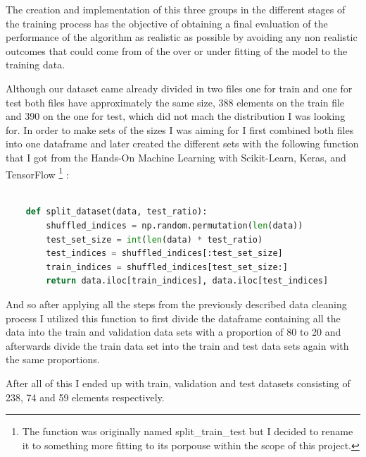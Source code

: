 \documentclass[12pt, a4paper]{article}
\begin{document}
	The creation and implementation of this three groups in the different stages of the training process has the objective of obtaining a final evaluation of the performance of the algorithm as realistic as possible by avoiding any non realistic outcomes that could come from of the over or under fitting of the model to the training data.
	
	Although our dataset came already divided in two files one for train and one for test both files have approximately the same size, 388 elements on the train file and 390 on the one for test, which did not mach the distribution I was looking for. In order to make sets of the sizes I was aiming for I first combined both files into one dataframe and later created the different sets with the following function that I got from the Hands-On Machine Learning with Scikit-Learn, Keras, and TensorFlow \footnote{The function was originally named split\_train\_test but I decided to rename it to something more fitting to its porpouse within the scope of this project.} \cite{handsonmachinelearning}:
	
		\vspace{5mm}
	
	\begin{lstlisting}[language=Python]
		
	def split_dataset(data, test_ratio):
		shuffled_indices = np.random.permutation(len(data))
		test_set_size = int(len(data) * test_ratio)
		test_indices = shuffled_indices[:test_set_size]
		train_indices = shuffled_indices[test_set_size:]
		return data.iloc[train_indices], data.iloc[test_indices]
	\end{lstlisting}
	
	And so after applying all the steps from the previously described data cleaning process I utilized this function to first divide the dataframe containing all the data into the train and validation data sets with a proportion of 80 to 20 and afterwards divide the train data set into the train and test data sets again with the same proportions.
	
	After all of this I ended up with train, validation and test datasets consisting of 238, 74 and 59 elements respectively.
	
	
\end{document}
